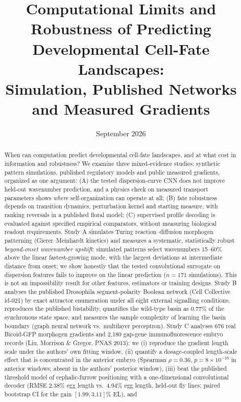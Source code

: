 \documentclass[12pt]{article}
\title{Computational Limits and Robustness of Predicting\\Developmental Cell-Fate Landscapes:\\Simulation, Published Networks and Measured Gradients}
\date{September 2026}
\begin{document}
\maketitle
\begin{abstract}
\noindent When can computation predict developmental cell-fate landscapes, and at
what cost in information and robustness? We examine three mixed-evidence studies: synthetic pattern simulations, published regulatory models and public measured gradients, organized as one argument: (A) the tested dispersion-curve CNN does not improve held-out wavenumber prediction, and a physics check on measured
transport parameters shows \emph{where} self-organization can operate at all;
(B) fate robustness depends on transition dynamics, perturbation kernel and
starting measure, with ranking reversals in a published floral model; (C) supervised profile decoding is evaluated against specified empirical comparators, without measuring biological readout requirements. Study A simulates Turing reaction--diffusion
morphogen patterning (Gierer--Meinhardt kinetics) and measures a systematic,
statistically robust \emph{beyond-onset wavenumber upshift}: simulated patterns
select wavenumbers 15--60\% above the linear fastest-growing mode, with the
largest deviations at intermediate distance from onset; we show honestly that
the tested convolutional surrogate on dispersion features fails to improve on the linear prediction ($n=171$ simulations). This is not an impossibility result for other features, estimators or training designs. Study B analyses the published
Drosophila segment-polarity Boolean network (Cell Collective id-021) by exact
attractor enumeration under all eight external signalling conditions,
reproduces the published bistability, quantifies the wild-type basin as
$0.77\%$ of the synchronous state space, and measures the sample complexity of
learning the basin boundary (graph neural network vs.\ multilayer perceptron).
Study C analyses 676 real Bicoid-GFP morphogen gradients and 2{,}180
gap-gene immunofluorescence embryo records (Liu, Morrison \& Gregor, PNAS
2013): we (i) reproduce the gradient length scale under the authors' own
fitting window, (ii) quantify a dosage-coupled length-scale effect that is
concentrated in the anterior embryo (Spearman $\rho=0.36$, $p=8\times10^{-16}$
in anterior windows; absent in the authors' posterior window), (iii) beat the
published threshold model of cephalic-furrow positioning with a one-dimensional
convolutional decoder (RMSE 2.38\% egg length vs.\ 4.94\% egg length,
held-out fly lines; paired bootstrap CI for the gain $[1.99,3.11]\%$ EL), and

\end{abstract}
\end{document}
